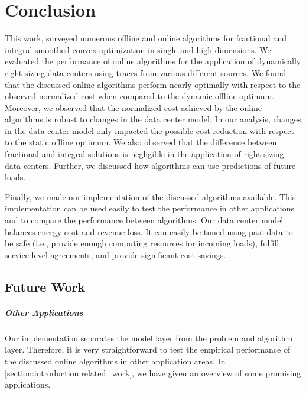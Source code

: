 
\chapter{Conclusion}\label{chapter:conclusion}

This work, surveyed numerous offline and online algorithms for fractional and integral smoothed convex optimization in single and high dimensions. We evaluated the performance of online algorithms for the application of dynamically right-sizing data centers using traces from various different sources. We found that the discussed online algorithms perform nearly optimally with respect to the observed normalized cost when compared to the dynamic offline optimum. Moreover, we observed that the normalized cost achieved by the online algorithms is robust to changes in the data center model. In our analysis, changes in the data center model only impacted the possible cost reduction with respect to the static offline optimum. We also observed that the difference between fractional and integral solutions is negligible in the application of right-sizing data centers. Further, we discussed how algorithms can use predictions of future loads.

Finally, we made our implementation of the discussed algorithms available. This implementation can be used easily to test the performance in other applications and to compare the performance between algorithms. Our data center model balances energy cost and revenue loss. It can easily be tuned using past data to be safe (i.e., provide enough computing resources for incoming loads), fulfill service level agreements, and provide significant cost savings.

\section{Future Work}

\paragraph{Other Applications} Our implementation separates the model layer from the problem and algorithm layer. Therefore, it is very straightforward to test the empirical performance of the discussed online algorithms in other application areas. In \cref{section:introduction:related_work}, we have given an overview of some promising applications.

